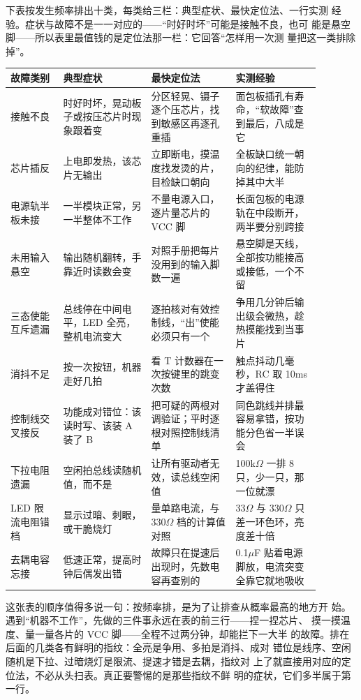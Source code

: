 下表按发生频率排出十类，每类给三栏：典型症状、最快定位法、一行实测
经验。症状与故障不是一一对应的——“时好时坏”可能是接触不良，也可
能是悬空脚——所以表里最值钱的是定位法那一栏：它回答“怎样用一次测
量把这一类排除掉”。

\begin{longtable}{L{0.15\linewidth}L{0.25\linewidth}L{0.24\linewidth}L{0.24\linewidth}}
\toprule
故障类别 & 典型症状 & 最快定位法 & 实测经验 \\
\midrule
接触不良 & 时好时坏，晃动板子或按压芯片时现象跟着变 & 分区轻晃、镊子逐个压芯片，找到敏感区再逐孔重插 & 面包板插孔有寿命，“软故障”查到最后，八成是它 \\\tablerowrule
芯片插反 & 上电即发热，该芯片无输出 & 立即断电，摸温度找发烫的片，目检缺口朝向 & 全板缺口统一朝向的纪律，能防掉其中大半 \\\tablerowrule
电源轨半板未接 & 一半模块正常，另一半整体不工作 & 不量电源入口，逐片量芯片的 VCC 脚 & 长面包板的电源轨在中段断开，两半要分别跨接 \\\tablerowrule
未用输入悬空 & 输出随机翻转，手靠近时读数会变 & 对照手册把每片没用到的输入脚数一遍 & 悬空脚是天线，全部按功能接高或接低，一个不留 \\\tablerowrule
三态使能互斥遗漏 & 总线停在中间电平，LED 全亮，整机电流变大 & 逐拍核对有效控制线，“出”使能必须只有一个 & 争用几分钟后输出级会微热，趁热摸能找到当事片 \\\tablerowrule
消抖不足 & 按一次按钮，机器走好几拍 & 看 T 计数器在一次按键里的跳变次数 & 触点抖动几毫秒，RC 取 10ms 才盖得住 \\\tablerowrule
控制线交叉接反 & 功能成对错位：该读时写、该装 A 装了 B & 把可疑的两根对调验证；平时逐根对照控制线清单 & 同色跳线并排最容易拿错，按功能分色省一半误会 \\\tablerowrule
下拉电阻遗漏 & 空闲拍总线读随机值，而不是  & 让所有驱动者无效，读总线空闲值 & 100k$\Omega$ 一排 8 只，少一只，那一位就漂 \\\tablerowrule
LED 限流电阻错档 & 显示过暗、刺眼，或干脆烧灯 & 量单路电流，与 330$\Omega$ 档的计算值对照 & 33$\Omega$ 与 330$\Omega$ 只差一环色环，亮度差十倍 \\\tablerowrule
去耦电容忘接 & 低速正常，提高时钟后偶发出错 & 故障只在提速后出现时，先数电容再查别的 & 0.1$\mu$F 贴着电源脚放，电流突变全靠它就地吸收 \\
\bottomrule
\end{longtable}

这张表的顺序值得多说一句：按频率排，是为了让排查从概率最高的地方开
始。遇到“机器不工作”，先做的三件事永远在表的前三行——捏一捏芯片、
摸一摸温度、量一量各片的 VCC 脚——全程不过两分钟，却能拦下一大半
的故障。排在后面的几类各有鲜明的指纹：全亮是争用、多拍是消抖、成对
错位是线序、空闲随机是下拉、过暗烧灯是限流、提速才错是去耦，指纹对
上了就直接用对应的定位法，不必从头扫表。真正要警惕的是那些指纹不鲜
明的症状，它们多半属于第一行。

